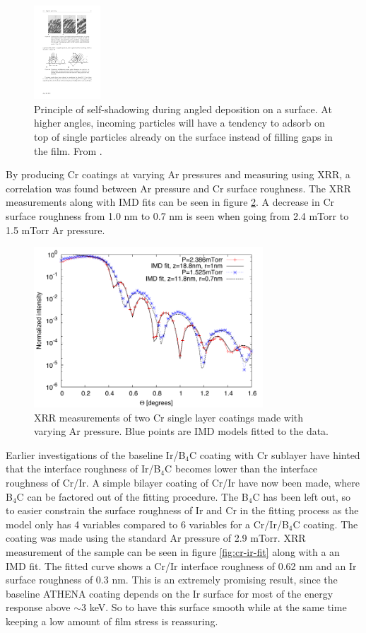 \begin{figure}[!h]
	\center
	\includegraphics[height=3.5cm]{figures/athena/coatings/self-shadow.pdf}
\caption{\footnotesize Principle of self-shadowing during angled deposition on a surface. At higher angles, incoming particles will have a tendency to adsorb on top of single particles already on the surface instead of filling gaps in the film. From \cite{Dirks:1977uk}.}\label{fig:self-shadow}
\end{figure}

By producing Cr coatings at varying Ar pressures and measuring using XRR, a correlation was found between Ar pressure and Cr surface roughness. The XRR measurements along with IMD fits can be seen in figure \ref{fig:cr-pressure-fit}. A decrease in Cr surface roughness from 1.0 nm to 0.7 nm is seen when going from 2.4 mTorr to 1.5 mTorr Ar pressure.

\begin{figure}[!h]
	\center
	\includegraphics[height=6cm]{figures/athena/coatings/cr-pressure-fit.pdf}
\caption{\footnotesize XRR measurements of two Cr single layer coatings made with varying Ar pressure. Blue points are IMD models fitted to the data.}\label{fig:cr-pressure-fit}
\end{figure}

Earlier investigations of the baseline Ir/B$_4$C coating with Cr sublayer\cite{Jakobsen:2011vd} have hinted that the interface roughness of Ir/B$_4$C becomes lower than the interface roughness of Cr/Ir. A simple bilayer coating of Cr/Ir have now been made, where B$_4$C can be factored out of the fitting procedure. The B$_4$C has been left out, so to easier constrain the surface roughness of Ir and Cr in the fitting process as the model only has 4 variables compared to 6 variables for a Cr/Ir/B$_4$C coating. The coating was made using the standard Ar pressure of 2.9 mTorr. XRR measurement of the sample can be seen in figure \ref{fig:cr-ir-fit} along with a an IMD fit. The fitted curve shows a Cr/Ir interface roughness of 0.62 nm and an Ir surface roughness of 0.3 nm.
This is an extremely promising result, since the baseline ATHENA coating depends on the Ir surface for most of the energy response above $\sim$3 keV. So to have this surface smooth while at the same time keeping a low amount of film stress is reassuring.

